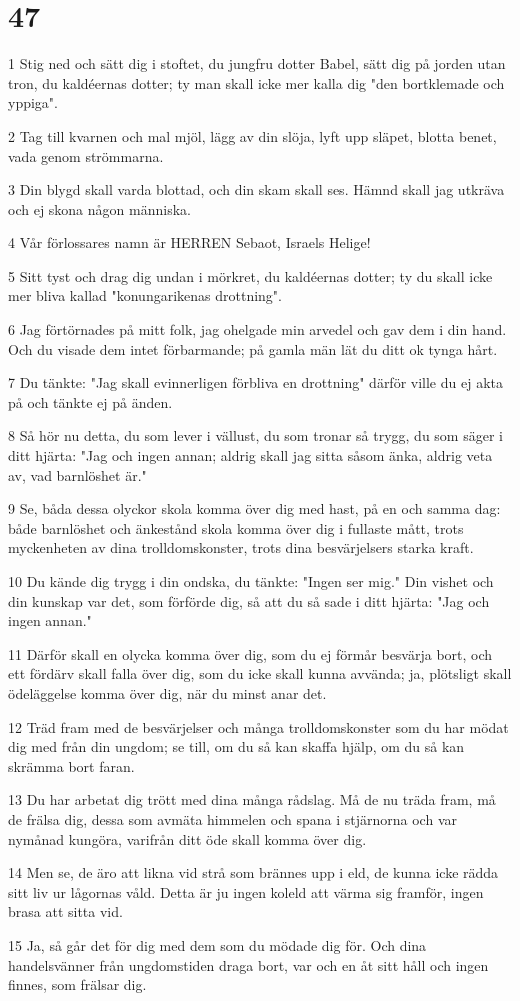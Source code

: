 \chapter{47}

\par 1 Stig ned och sätt dig i stoftet, du jungfru dotter Babel, sätt dig på jorden utan tron, du kaldéernas dotter; ty man skall icke mer kalla dig "den bortklemade och yppiga".
\par 2 Tag till kvarnen och mal mjöl, lägg av din slöja, lyft upp släpet, blotta benet, vada genom strömmarna.
\par 3 Din blygd skall varda blottad, och din skam skall ses. Hämnd skall jag utkräva och ej skona någon människa.
\par 4 Vår förlossares namn är HERREN Sebaot, Israels Helige!
\par 5 Sitt tyst och drag dig undan i mörkret, du kaldéernas dotter; ty du skall icke mer bliva kallad "konungarikenas drottning".
\par 6 Jag förtörnades på mitt folk, jag ohelgade min arvedel och gav dem i din hand. Och du visade dem intet förbarmande; på gamla män lät du ditt ok tynga hårt.
\par 7 Du tänkte: "Jag skall evinnerligen förbliva en drottning" därför ville du ej akta på och tänkte ej på änden.
\par 8 Så hör nu detta, du som lever i vällust, du som tronar så trygg, du som säger i ditt hjärta: "Jag och ingen annan; aldrig skall jag sitta såsom änka, aldrig veta av, vad barnlöshet är."
\par 9 Se, båda dessa olyckor skola komma över dig med hast, på en och samma dag: både barnlöshet och änkestånd skola komma över dig i fullaste mått, trots myckenheten av dina trolldomskonster, trots dina besvärjelsers starka kraft.
\par 10 Du kände dig trygg i din ondska, du tänkte: "Ingen ser mig." Din vishet och din kunskap var det, som förförde dig, så att du så sade i ditt hjärta: "Jag och ingen annan."
\par 11 Därför skall en olycka komma över dig, som du ej förmår besvärja bort, och ett fördärv skall falla över dig, som du icke skall kunna avvända; ja, plötsligt skall ödeläggelse komma över dig, när du minst anar det.
\par 12 Träd fram med de besvärjelser och många trolldomskonster som du har mödat dig med från din ungdom; se till, om du så kan skaffa hjälp, om du så kan skrämma bort faran.
\par 13 Du har arbetat dig trött med dina många rådslag. Må de nu träda fram, må de frälsa dig, dessa som avmäta himmelen och spana i stjärnorna och var nymånad kungöra, varifrån ditt öde skall komma över dig.
\par 14 Men se, de äro att likna vid strå som brännes upp i eld, de kunna icke rädda sitt liv ur lågornas våld. Detta är ju ingen koleld att värma sig framför, ingen brasa att sitta vid.
\par 15 Ja, så går det för dig med dem som du mödade dig för. Och dina handelsvänner från ungdomstiden draga bort, var och en åt sitt håll och ingen finnes, som frälsar dig.

